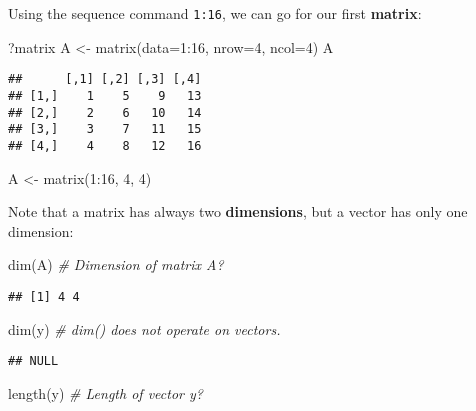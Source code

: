 \documentclass[
]{book}
\newenvironment{Shaded}{\begin{snugshade}}{\end{snugshade}}
\newcommand{\AttributeTok}[1]{\textcolor[rgb]{0.77,0.63,0.00}{#1}}
\newcommand{\CommentTok}[1]{\textcolor[rgb]{0.56,0.35,0.01}{\textit{#1}}}
\newcommand{\DecValTok}[1]{\textcolor[rgb]{0.00,0.00,0.81}{#1}}
\newcommand{\FunctionTok}[1]{\textcolor[rgb]{0.00,0.00,0.00}{#1}}
\newcommand{\NormalTok}[1]{#1}
\newcommand{\OtherTok}[1]{\textcolor[rgb]{0.56,0.35,0.01}{#1}}
\newcommand{\SpecialCharTok}[1]{\textcolor[rgb]{0.00,0.00,0.00}{#1}}
\begin{document}
Using the sequence command \texttt{1:16}, we can go for our first \textbf{matrix}:

\begin{Shaded}
\begin{Highlighting}[]
\NormalTok{?matrix}
\NormalTok{A }\OtherTok{\textless{}{-}} \FunctionTok{matrix}\NormalTok{(}\AttributeTok{data=}\DecValTok{1}\SpecialCharTok{:}\DecValTok{16}\NormalTok{, }\AttributeTok{nrow=}\DecValTok{4}\NormalTok{, }\AttributeTok{ncol=}\DecValTok{4}\NormalTok{)}
\NormalTok{A}
\end{Highlighting}
\end{Shaded}

\begin{verbatim}
##      [,1] [,2] [,3] [,4]
## [1,]    1    5    9   13
## [2,]    2    6   10   14
## [3,]    3    7   11   15
## [4,]    4    8   12   16
\end{verbatim}

\begin{Shaded}
\begin{Highlighting}[]
\NormalTok{A }\OtherTok{\textless{}{-}} \FunctionTok{matrix}\NormalTok{(}\DecValTok{1}\SpecialCharTok{:}\DecValTok{16}\NormalTok{, }\DecValTok{4}\NormalTok{, }\DecValTok{4}\NormalTok{)}
\end{Highlighting}
\end{Shaded}

Note that a matrix has always two \textbf{dimensions}, but a vector has only one dimension:

\begin{Shaded}
\begin{Highlighting}[]
\FunctionTok{dim}\NormalTok{(A)    }\CommentTok{\# Dimension of matrix A?}
\end{Highlighting}
\end{Shaded}

\begin{verbatim}
## [1] 4 4
\end{verbatim}

\begin{Shaded}
\begin{Highlighting}[]
\FunctionTok{dim}\NormalTok{(y)    }\CommentTok{\# dim() does not operate on vectors.}
\end{Highlighting}
\end{Shaded}

\begin{verbatim}
## NULL
\end{verbatim}

\begin{Shaded}
\begin{Highlighting}[]
\FunctionTok{length}\NormalTok{(y) }\CommentTok{\# Length of vector y?}
\end{Highlighting}
\end{Shaded}
\end{document}
